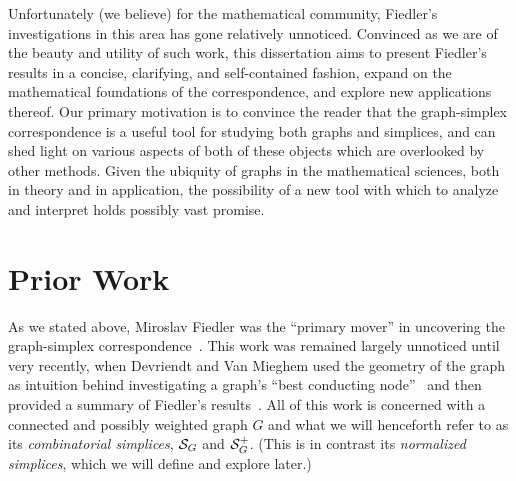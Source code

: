 Unfortunately (we believe) for  the mathematical community,  Fiedler's investigations in this area  has  gone relatively unnoticed. Convinced as we are of  the beauty and  utility of such  work, this dissertation aims to present Fiedler's  results in a concise, clarifying, and self-contained fashion,  expand on the mathematical  foundations of the correspondence, and explore new applications thereof. Our primary motivation is to convince the reader that the graph-simplex correspondence is a  useful tool for studying both graphs and simplices,  and  can shed light on various  aspects of both of these objects which are  overlooked by other  methods. Given the ubiquity of graphs in the mathematical  sciences, both in theory and in application, the possibility of a new tool with which to analyze and interpret holds possibly vast promise. 



\section{Prior Work}
\label{sec:intro_prior_work}


As we stated  above, Miroslav Fiedler was the ``primary  mover''  in  uncovering the graph-simplex correspondence~\cite{fiedler1993geometric,fiedler2005geometry,fiedler2011matrices}.  This work was remained largely unnoticed until very recently, when Devriendt and Van Mieghem used the geometry of the graph as intuition behind investigating  a graph's ``best conducting node''~\cite{van2017pseudoinverse} and  then provided a summary  of Fiedler's results~\cite{devriendt2018simplex}. All of this work is concerned  with a connected and possibly  weighted graph $G$ and what we will henceforth  refer to as its  \emph{combinatorial simplices}, $\mathcal{S}_G$ and $\mathcal{S}_G^+$. (This is in contrast its \emph{normalized simplices}, which we  will define and explore later.) 

